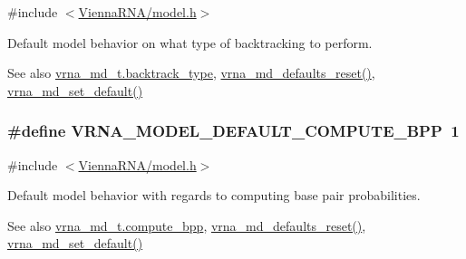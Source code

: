 {\ttfamily \#include $<$\hyperlink{model_8h}{Vienna\+R\+N\+A/model.\+h}$>$}



Default model behavior on what type of backtracking to perform. 

\begin{DoxySeeAlso}{See also}
\hyperlink{structvrna__md__s_abb265da25121d22ed11c8435861f0e53}{vrna\+\_\+md\+\_\+t.\+backtrack\+\_\+type}, \hyperlink{group__model__details_ga70834424cf804d149937de89f80ceb45}{vrna\+\_\+md\+\_\+defaults\+\_\+reset()}, \hyperlink{group__model__details_ga8ac6ff84936282436f822644bf841f66}{vrna\+\_\+md\+\_\+set\+\_\+default()} 
\end{DoxySeeAlso}
\subsubsection[{\texorpdfstring{V\+R\+N\+A\+\_\+\+M\+O\+D\+E\+L\+\_\+\+D\+E\+F\+A\+U\+L\+T\+\_\+\+C\+O\+M\+P\+U\+T\+E\+\_\+\+B\+PP}{VRNA_MODEL_DEFAULT_COMPUTE_BPP}}]{\setlength{\rightskip}{0pt plus 5cm}\#define V\+R\+N\+A\+\_\+\+M\+O\+D\+E\+L\+\_\+\+D\+E\+F\+A\+U\+L\+T\+\_\+\+C\+O\+M\+P\+U\+T\+E\+\_\+\+B\+PP~1}\hypertarget{group__model__details_ga1d6cd5051940b126c248147c011bac6c}{}\label{group__model__details_ga1d6cd5051940b126c248147c011bac6c}


{\ttfamily \#include $<$\hyperlink{model_8h}{Vienna\+R\+N\+A/model.\+h}$>$}



Default model behavior with regards to computing base pair probabilities. 

\begin{DoxySeeAlso}{See also}
\hyperlink{structvrna__md__s_aa0c3e03d9064363e27adcc92b8d0380f}{vrna\+\_\+md\+\_\+t.\+compute\+\_\+bpp}, \hyperlink{group__model__details_ga70834424cf804d149937de89f80ceb45}{vrna\+\_\+md\+\_\+defaults\+\_\+reset()}, \hyperlink{group__model__details_ga8ac6ff84936282436f822644bf841f66}{vrna\+\_\+md\+\_\+set\+\_\+default()} 
\end{DoxySeeAlso}
